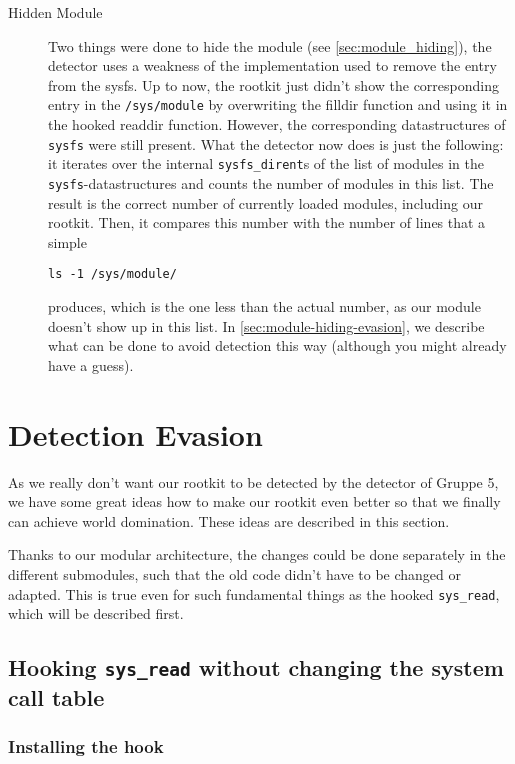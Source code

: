 \documentclass[10pt, letterpaper]{scrartcl}
\begin{document}
\begin{description}
\item[Hidden Module] Two things were done to hide the module (see \autoref{sec:module_hiding}), the detector uses a weakness of the implementation used to remove the entry from the sysfs. Up to now, the rootkit just didn't show the corresponding entry in the \texttt{/sys/module} by overwriting the filldir function and using it in the hooked readdir function. However, the corresponding datastructures of \texttt{sysfs} were still present. What the detector now does is just the following: it iterates over the internal \texttt{sysfs\_dirent}s of the list of modules in the \texttt{sysfs}-datastructures and counts the number of modules in this list. The result is the correct number of currently loaded modules, including our rootkit. Then, it compares this number with the number of lines that a simple 
\begin{verbatim}
ls -1 /sys/module/
\end{verbatim}
produces, which is the one less than the actual number, as our module doesn't show up in this list. In \autoref{sec:module-hiding-evasion}, we describe what can be done to avoid detection this way (although you might already have a guess).

\end{description}

\section{Detection Evasion}
\label{sec:detection-evasion}
As we really don't want our rootkit to be detected by the detector of Gruppe 5, we have some great ideas how to make our rootkit even better so that we finally can achieve world domination. These ideas are described in this section.

Thanks to our modular architecture, the changes could be done separately in the different submodules, such that the old code didn't have to be changed or adapted. This is true even for such fundamental things as the hooked \texttt{sys\_read}, which will be described first.

\subsection{Hooking \texttt{sys\_read} without changing the system call table}
\label{sec:hooking-read-2}

\subsubsection{Installing the hook}
\label{sec:hooking-read-install-hook}
\end{document}
